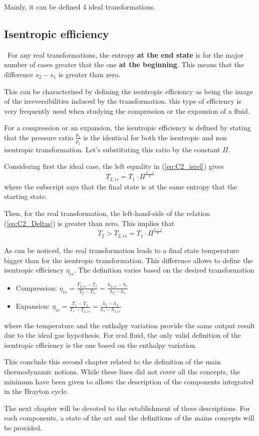 Mainly, it can be defined 4 ideal transformations.





\subsection{Isentropic efficiency} \label{C2:Isen_eff}
\quad\, For any real transformations, the entropy \textbf{at the end state} is for the major number of cases greater that the one \textbf{at the beginning}. This means that the difference $s_2 - s_1$ is greater than zero.

This can be characterized by defining the isentropic efficiency as being the image of the irreversibilities induced by the transformation. this type of efficiency is very frequently used when studying the compression or the expansion of a fluid.

For a compression or an expansion, the isentropic efficiency is defined by stating that the pressure ratio $\frac{p_1}{p_2}$ is the identical for both the isentropic and non isentropic transformation. Let's substituting this ratio by the constant $\Pi$. 

Considering first the ideal case, the left equality in (\ref{eq:C2_isrel}) gives
\begin{equation}
T_{2,is} = T_1\cdot\Pi^\frac{k-1}{k}
\end{equation}
where the subscript says that the final state is at the same entropy that the starting state.

Then, for the real transformation, the left-hand-side of the relation (\ref{eq:C2_Deltas}) is greater than zero. This implies that
\begin{equation}
T_{2} > T_{2,is} = T_1\cdot\Pi^\frac{k-1}{k}
\end{equation}

As can be noticed, the real transformation leads to a final state temperature bigger than for the isentropic transformation. This difference allows to define the isentropic efficiency $\eta_{is}$. The definition varies based on the desired transformation
\begin{itemize}
\item Compression: $\eta_{is}=\frac{T_{2,is}-T_1}{T_2-T_1}=\frac{h_{2,is}-h_1}{h_2-h_1}$
\item Expansion: $\eta_{is}=\frac{T_1-T_{2}}{T_1-T_{2,is}}=\frac{h_1-h_{2}}{h_1-h_{2,is}}$
\end{itemize}
where the temperature and the enthalpy variation provide the same output result due to the ideal gas hypothesis. For real fluid, the only valid definition of the isentropic efficiency is the one based on the enthalpy variation.

This conclude this second chapter related to the definition of the main thermodynamic notions. While these lines did not cover all the concepts, the minimum have been given to allows the description of the components integrated in the Brayton cycle. 

The next chapter will be devoted to the establishment of these descriptions. For each components, a state of the art and the definitions of the mains concepts will be provided. 